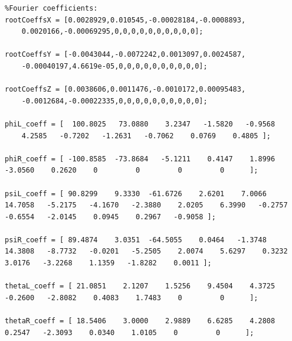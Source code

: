 \begin{verbatim}
%Fourier coefficients:
rootCoeffsX = [0.0028929,0.010545,-0.00028184,-0.0008893,
    0.0020166,-0.00069295,0,0,0,0,0,0,0,0,0,0];
    
rootCoeffsY = [-0.0043044,-0.0072242,0.0013097,0.0024587,
    -0.00040197,4.6619e-05,0,0,0,0,0,0,0,0,0,0];
    
rootCoeffsZ = [0.0038606,0.0011476,-0.0010172,0.00095483,
    -0.0012684,-0.00022335,0,0,0,0,0,0,0,0,0,0];
    
phiL_coeff = [  100.8025   73.0880    3.2347   -1.5820   -0.9568   
    4.2585   -0.7202   -1.2631   -0.7062    0.0769    0.4805 ];
    
phiR_coeff = [ -100.8585  -73.8684   -5.1211    0.4147    1.8996 
-3.0560    0.2620    0         0         0         0      ];

psiL_coeff = [ 90.8299    9.3330  -61.6726    2.6201    7.0066 
14.7058   -5.2175   -4.1670   -2.3880    2.0205    6.3990   -0.2757   
-0.6554   -2.0145    0.0945    0.2967   -0.9058 ];

psiR_coeff = [ 89.4874    3.0351  -64.5055    0.0464   -1.3748
14.3808   -8.7732   -0.0201   -5.2505    2.0074    5.6297    0.3232
3.0176   -3.2268    1.1359   -1.8282    0.0011 ];

thetaL_coeff = [ 21.0851    2.1207    1.5256    9.4504    4.3725 
-0.2600   -2.8082    0.4083    1.7483    0         0      ];

thetaR_coeff = [ 18.5406    3.0000    2.9889    6.6285    4.2808 
0.2547   -2.3093    0.0340    1.0105    0         0      ];

\end{verbatim}

